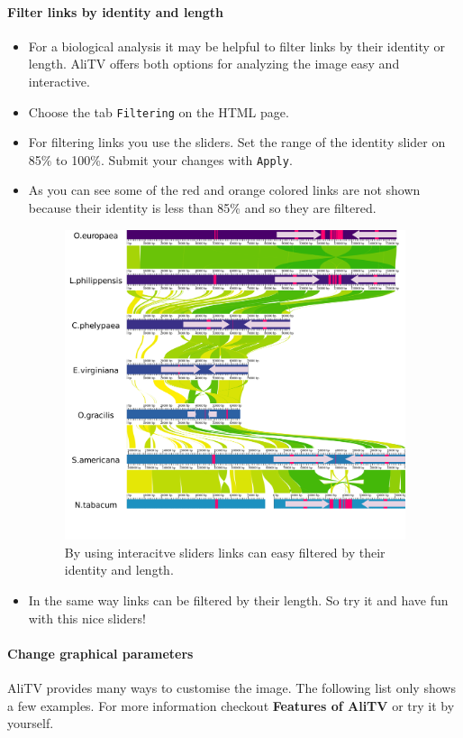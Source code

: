 \documentclass[a4paper]{scrartcl}
\begin{document}
\paragraph*{Filter links by identity and length}
\begin{itemize}
	\item For a biological analysis it may be helpful to filter links by their identity or length. AliTV offers both options for analyzing the image easy and interactive.
	\item Choose the tab \texttt{Filtering} on the HTML page.
	\item For filtering links you use the sliders. Set the range of the identity slider on 85\% to 100\%. Submit your changes with \texttt{Apply}.
	\item As you can see some of the red and orange colored links are not shown because their identity is less than 85\% and so they are filtered.
	\begin{figure}[H]
		\centering
		\includegraphics[width=10cm]{filterLinks.png}
		\caption{By using interacitve sliders links can easy filtered by their identity and length.}
	\end{figure}
	\item In the same way links can be filtered by their length. So try it and have fun with this nice sliders!
\end{itemize}

\paragraph*{Change graphical parameters}
AliTV provides many ways to customise the image. The following list only shows a few examples. For more information checkout \textbf{Features of AliTV} or try it by yourself.
\end{document}
